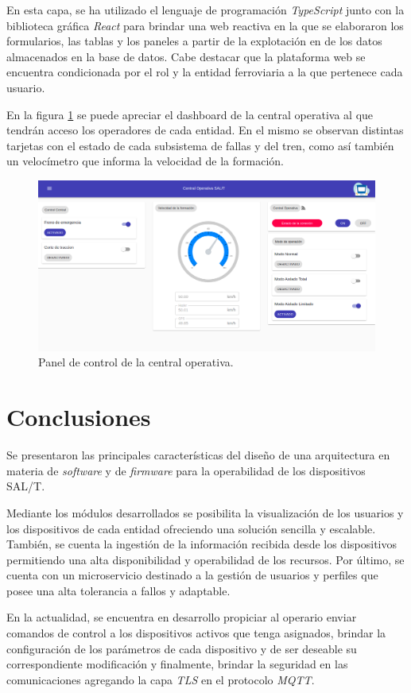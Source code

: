 \documentclass[a4paper]{IEEEtran}
\begin{document}
En esta capa, se ha utilizado el lenguaje de programación \textit{TypeScript} \cite{b17} junto con la biblioteca gráfica \textit{React} \cite{b18} para brindar una web reactiva en la que se elaboraron los formularios, las tablas y los paneles a partir de la explotación en de los datos almacenados en la base de datos. Cabe destacar que la plataforma web se encuentra condicionada por el rol y la entidad ferroviaria a la que pertenece cada usuario.

En la figura \ref{fig:dashboard} se puede apreciar el dashboard de la central operativa al que tendrán acceso los operadores de cada entidad.
En el mismo se observan distintas tarjetas con el estado de cada subsistema de fallas y del tren, como así también un velocímetro que
informa la velocidad de la formación.

\begin{figure}[ht]
\centering 
\includegraphics[width=.47\textwidth]{images/cental.png}
\caption{Panel de control de la central operativa.}
\label{fig:dashboard}
\end{figure}

\section{Conclusiones}

Se presentaron las principales características del diseño de una arquitectura en materia de \textit{software} y de \textit{firmware} para la operabilidad de los dispositivos SAL/T.

Mediante los módulos desarrollados se posibilita la visualización de los usuarios y los dispositivos de cada entidad ofreciendo una solución sencilla y escalable. También, se cuenta la ingestión de la información recibida desde los dispositivos permitiendo una alta disponibilidad y operabilidad de los recursos. Por último, se cuenta con un microservicio destinado a la gestión de usuarios y perfiles que posee una alta tolerancia a fallos y adaptable.

En la actualidad, se encuentra en desarrollo propiciar al operario enviar comandos de control a los dispositivos activos que tenga asignados, brindar la configuración de los parámetros de cada dispositivo y de ser deseable su correspondiente modificación y finalmente, brindar la seguridad en las comunicaciones agregando la capa \textit{TLS} en el protocolo \textit{MQTT}. 
\end{document}

